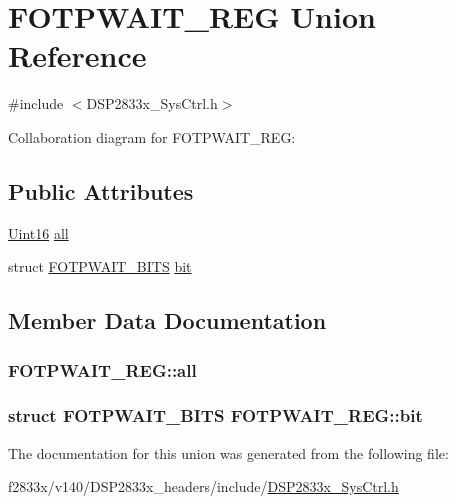 \hypertarget{union_f_o_t_p_w_a_i_t___r_e_g}{}\section{F\+O\+T\+P\+W\+A\+I\+T\+\_\+\+R\+E\+G Union Reference}
\label{union_f_o_t_p_w_a_i_t___r_e_g}


{\ttfamily \#include $<$D\+S\+P2833x\+\_\+\+Sys\+Ctrl.\+h$>$}



Collaboration diagram for F\+O\+T\+P\+W\+A\+I\+T\+\_\+\+R\+E\+G\+:
\subsection*{Public Attributes}
\begin{DoxyCompactItemize}
\item 
\hyperlink{_d_s_p2833x___device_8h_a59a9f6be4562c327cbfb4f7e8e18f08b}{Uint16} \hyperlink{union_f_o_t_p_w_a_i_t___r_e_g_ab014549b16696d6ae7c81a15e8ba6985}{all}
\item 
struct \hyperlink{struct_f_o_t_p_w_a_i_t___b_i_t_s}{F\+O\+T\+P\+W\+A\+I\+T\+\_\+\+B\+I\+T\+S} \hyperlink{union_f_o_t_p_w_a_i_t___r_e_g_ae75b3daac3662a229c803d7c3c8c2509}{bit}
\end{DoxyCompactItemize}


\subsection{Member Data Documentation}
\hypertarget{union_f_o_t_p_w_a_i_t___r_e_g_ab014549b16696d6ae7c81a15e8ba6985}{}
\subsubsection[{all}]{ F\+O\+T\+P\+W\+A\+I\+T\+\_\+\+R\+E\+G\+::all}\label{union_f_o_t_p_w_a_i_t___r_e_g_ab014549b16696d6ae7c81a15e8ba6985}
\hypertarget{union_f_o_t_p_w_a_i_t___r_e_g_ae75b3daac3662a229c803d7c3c8c2509}{}
\subsubsection[{bit}]{\setlength{\rightskip}{0pt plus 5cm}struct {\bf F\+O\+T\+P\+W\+A\+I\+T\+\_\+\+B\+I\+T\+S} F\+O\+T\+P\+W\+A\+I\+T\+\_\+\+R\+E\+G\+::bit}\label{union_f_o_t_p_w_a_i_t___r_e_g_ae75b3daac3662a229c803d7c3c8c2509}


The documentation for this union was generated from the following file\+:\begin{DoxyCompactItemize}
\item 
f2833x/v140/\+D\+S\+P2833x\+\_\+headers/include/\hyperlink{_d_s_p2833x___sys_ctrl_8h}{D\+S\+P2833x\+\_\+\+Sys\+Ctrl.\+h}\end{DoxyCompactItemize}

